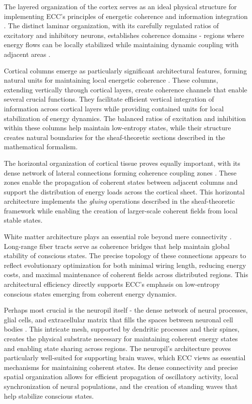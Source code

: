 \begin{refsection}
The layered organization of the cortex serves as an ideal physical structure for implementing ECC's principles of energetic coherence and information integration \cite{Douglas2004}. The distinct laminar organization, with its carefully regulated ratios of excitatory and inhibitory neurons, establishes coherence domains - regions where energy flows can be locally stabilized while maintaining dynamic coupling with adjacent areas \cite{Harris2015}.

Cortical columns emerge as particularly significant architectural features, forming natural units for maintaining local energetic coherence \cite{Mountcastle1997}. These columns, extending vertically through cortical layers, create coherence channels that enable several crucial functions. They facilitate efficient vertical integration of information across cortical layers while providing contained units for local stabilization of energy dynamics. The balanced ratios of excitation and inhibition within these columns help maintain low-entropy states, while their structure creates natural boundaries for the sheaf-theoretic sections described in the mathematical formalism.

The horizontal organization of cortical tissue proves equally important, with its dense network of lateral connections forming coherence coupling zones \cite{DeFelipe2011}. These zones enable the propagation of coherent states between adjacent columns and support the distribution of energy loads across the cortical sheet. This horizontal architecture implements the \textit{gluing} operations described in the sheaf-theoretic framework while enabling the creation of larger-scale coherent fields from local stable states.

White matter architecture plays an essential role beyond mere connectivity \cite{Sporns2011}. Long-range fiber tracts serve as coherence bridges that help maintain global stability of conscious states. The precise topology of these connections appears to reflect evolutionary optimization for both minimal wiring length, reducing energy costs, and maximal maintenance of coherent fields across distributed regions. This architectural efficiency directly supports ECC's emphasis on low-entropy conscious states emerging from coherent energy dynamics.

Perhaps most crucial is the neuropil itself - the dense network of neural processes, glial cells, and extracellular matrix that fills the spaces between neuronal cell bodies \cite{Kasthuri2015}. This intricate mesh, supported by dendritic processes and their spines, creates the physical substrate necessary for maintaining coherent energy states and enabling state sharing across regions. The neuropil's architecture proves particularly well-suited for supporting brain waves, which ECC views as essential mechanisms for maintaining coherent states. Its dense connectivity and precise spatial organization allows for efficient propagation of oscillatory activity, local synchronization of neural populations, and the creation of standing waves that help stabilize conscious states.


\end{refsection}
